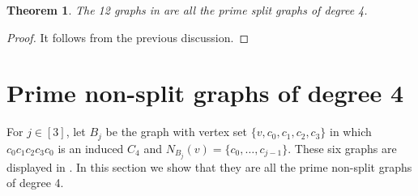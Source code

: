 \documentclass[11pt]{article}
\newtheorem{theorem}{Theorem}[section]
\begin{document}

\begin{theorem}
	\label{clasificacion.split.primos.deg=4}
	The 12 graphs in  are all the prime split graphs of degree 4.
\end{theorem}



\begin{proof}
	It follows from the previous discussion.
\end{proof}		



\section{Prime non-split graphs of degree 4}\label{sec_deg=4.no.split}


For $j\in[3]$, let $B_j$ be the graph with vertex set $\{v,c_0,c_1,c_2,c_3\}$ in which $c_0c_1c_2c_3c_0$ is an induced $C_4$ and $N_{B_j}(v)=\{c_0,\dots,c_{j-1}\}$. 
These six graphs are displayed in . In this section we show that they are all the prime non-split graphs of degree 4.
\end{document}
